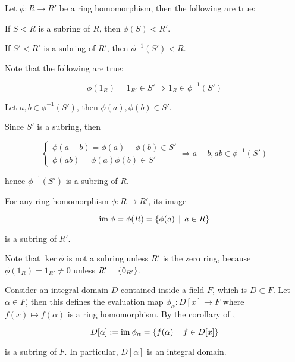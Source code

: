 \documentclass[a4paper,12pt]{article}
\begin{document}
\begin{pst}
  Let $\phi:R\to R'$ be a ring homomorphism, then the following are true:

  \begin{alist}
    \item If $S<R$ is a subring of $R$, then $\phi(S)<R'$.

    \item If $S'<R'$ is a subring of $R'$, then $\phi^{-1}(S')<R$.\n

    \prf Note that the following are true:

    \begin{rlist}
      \item

      $$\phi(1_{R})=1_{R'}\in S'\Rightarrow 1_{R}\in\phi^{-1}(S')$$

      \item Let $a,b\in\phi^{-1}(S')$, then $\phi(a),\phi(b)\in S'$.
    \end{rlist}

    Since $S'$ is a subring, then

    $$\begin{cases}
      \phi(a-b)=\phi(a)-\phi(b)\in S'\\
      \phi(ab)=\phi(a)\phi(b)\in S'
    \end{cases}\Rightarrow a-b,ab\in\phi^{-1}(S')$$\s

    hence $\phi^{-1}(S')$ is a subring of $R$.
  \end{alist}
\end{pst}\n

\begin{crl}
  For any ring homomorphism $\phi:R\to R'$, its image

  $$\mathrm{im}\:\phi=\phi(R)=\left\{ \phi(a)\,\mid\, a\in R\right\}$$\s

  is a subring of $R'$.
\end{crl}\n

Note that $\ker\phi$ is not a subring unless $R'$ is the zero ring, because $\phi(1_{R})=1_{R'}\neq 0$ unless $R'=\left\{ 0_{R'}\right\}$.\n

\begin{exm}
  Consider an integral domain $D$ contained inside a field $F$, which is $D\subset F$. Let $\alpha\in F$, then this defines the evaluation map $\phi_{\alpha}:D[x]\to F$ where $f(x)\mapsto f(\alpha)$ is a ring homomorphism. By the corollary of \rpst[\sctd{1}],

  $$D[\alpha]:=\mathrm{im}\:\phi_{\alpha}=\left\{ f(\alpha)\,\mid\, f\in D[x]\right\}$$\s

  is a subring of $F$. In particular, $D[\alpha]$ is an integral domain.
\end{exm}
\end{document}
